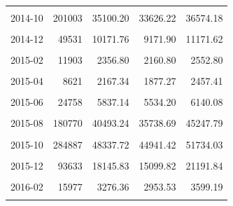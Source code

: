 \begin{longtable}[t]{crrrr}
\cellcolor{gray!10}{2014-09} & \cellcolor{gray!10}{220178} & \cellcolor{gray!10}{43093.83} & \cellcolor{gray!10}{39548.03} & \cellcolor{gray!10}{46639.63}\\
2014-10 & 201003 & 35100.20 & 33626.22 & 36574.18\\
\cellcolor{gray!10}{2014-11} & \cellcolor{gray!10}{86924} & \cellcolor{gray!10}{18251.16} & \cellcolor{gray!10}{16527.67} & \cellcolor{gray!10}{19974.66}\\
2014-12 & 49531 & 10171.76 & 9171.90 & 11171.62\\
\cellcolor{gray!10}{2015-01} & \cellcolor{gray!10}{26195} & \cellcolor{gray!10}{4473.73} & \cellcolor{gray!10}{3785.67} & \cellcolor{gray!10}{5161.79}\\
2015-02 & 11903 & 2356.80 & 2160.80 & 2552.80\\
\cellcolor{gray!10}{2015-03} & \cellcolor{gray!10}{7144} & \cellcolor{gray!10}{1744.08} & \cellcolor{gray!10}{1300.99} & \cellcolor{gray!10}{2187.18}\\
2015-04 & 8621 & 2167.34 & 1877.27 & 2457.41\\
\cellcolor{gray!10}{2015-05} & \cellcolor{gray!10}{8933} & \cellcolor{gray!10}{2100.35} & \cellcolor{gray!10}{1581.49} & \cellcolor{gray!10}{2619.21}\\
2015-06 & 24758 & 5837.14 & 5534.20 & 6140.08\\
\cellcolor{gray!10}{2015-07} & \cellcolor{gray!10}{43082} & \cellcolor{gray!10}{12618.71} & \cellcolor{gray!10}{9729.05} & \cellcolor{gray!10}{15508.37}\\
2015-08 & 180770 & 40493.24 & 35738.69 & 45247.79\\
\cellcolor{gray!10}{2015-09} & \cellcolor{gray!10}{323070} & \cellcolor{gray!10}{64455.78} & \cellcolor{gray!10}{60880.42} & \cellcolor{gray!10}{68031.13}\\
2015-10 & 284887 & 48337.72 & 44941.42 & 51734.03\\
\cellcolor{gray!10}{2015-11} & \cellcolor{gray!10}{139755} & \cellcolor{gray!10}{26020.34} & \cellcolor{gray!10}{22243.79} & \cellcolor{gray!10}{29796.88}\\
2015-12 & 93633 & 18145.83 & 15099.82 & 21191.84\\
\cellcolor{gray!10}{2016-01} & \cellcolor{gray!10}{29471} & \cellcolor{gray!10}{4921.70} & \cellcolor{gray!10}{4051.53} & \cellcolor{gray!10}{5791.87}\\
2016-02 & 15977 & 3276.36 & 2953.53 & 3599.19\\
\cellcolor{gray!10}{2016-03} & \cellcolor{gray!10}{14582} & \cellcolor{gray!10}{3579.51} & \cellcolor{gray!10}{3213.72} & \cellcolor{gray!10}{3945.30}\\

\end{longtable}

